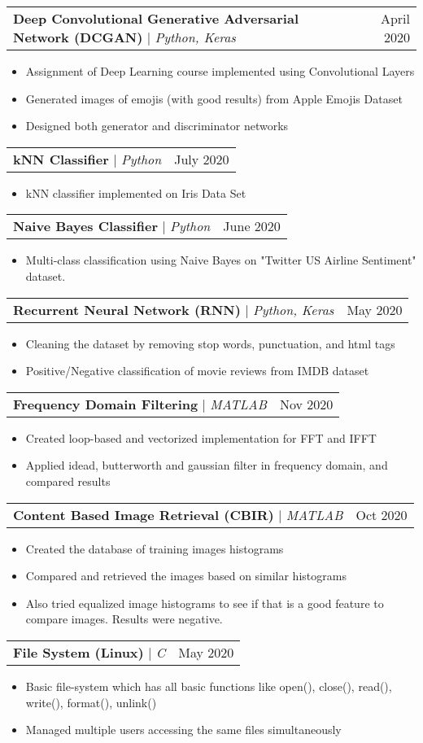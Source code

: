 \documentclass[letterpaper,11pt]{article}
\makeatletter
\newcommand{\resumeItem}[1]{
  \item\small{
    {#1 \vspace{-2pt}}
  }
}
\newcommand{\resumeProjectHeading}[2]{
    \item
    \begin{tabular*}{0.97\textwidth}{l@{\extracolsep{\fill}}r}
      \small#1 & #2 \\
    \end{tabular*}\vspace{-7pt}
}
\newcommand{\resumeItemListStart}{\begin{itemize}}
\newcommand{\resumeItemListEnd}{\end{itemize}\vspace{-5pt}}
\makeatother
\begin{document}
      \resumeProjectHeading
          {\textbf{Deep Convolutional Generative Adversarial Network (DCGAN)} $|$ \emph{Python, Keras}}{April 2020}
          \resumeItemListStart
            \resumeItem{Assignment of Deep Learning course implemented using Convolutional Layers}
            \resumeItem{Generated images of emojis (with good results) from Apple Emojis Dataset}
            \resumeItem{Designed both generator and discriminator networks}
          \resumeItemListEnd
          
      \resumeProjectHeading
          {\textbf{kNN Classifier} $|$ \emph{Python}}{July 2020}
          \resumeItemListStart
            \resumeItem{kNN classifier implemented on Iris Data Set}
          \resumeItemListEnd
          
      \resumeProjectHeading
          {\textbf{Naive Bayes Classifier} $|$ \emph{Python}}{June 2020}
          \resumeItemListStart
            \resumeItem{Multi-class classification using Naive Bayes on "Twitter US Airline Sentiment" dataset.}
          \resumeItemListEnd          
          
      \resumeProjectHeading
          {\textbf{Recurrent Neural Network (RNN)} $|$ \emph{Python, Keras}}{May 2020}
          \resumeItemListStart
            \resumeItem{Cleaning the dataset by removing stop words, punctuation, and html tags}
            \resumeItem{Positive/Negative classification of movie reviews from IMDB dataset}
          \resumeItemListEnd

      \resumeProjectHeading
          {\textbf{Frequency Domain Filtering} $|$ \emph{MATLAB}}{Nov 2020}
          \resumeItemListStart
            \resumeItem{Created loop-based and vectorized implementation for FFT and IFFT}
            \resumeItem {Applied idead, butterworth and gaussian filter in frequency domain, and compared results}
          \resumeItemListEnd
         
      \resumeProjectHeading
          {\textbf{Content Based Image Retrieval (CBIR)} $|$ \emph{MATLAB}}{Oct 2020}
          \resumeItemListStart
            \resumeItem{Created the database of training images histograms}
            \resumeItem {Compared and retrieved the images based on similar histograms}
            \resumeItem{Also tried equalized image histograms to see if that is a good feature to compare images. Results were negative.}
          \resumeItemListEnd
         
      \resumeProjectHeading
          {\textbf{File System (Linux)} $|$ \emph{C}}{May 2020}
          \resumeItemListStart
            \resumeItem{Basic file-system which has all basic functions like open(), close(), read(), write(), format(), unlink()}
            \resumeItem {Managed multiple users accessing the same files simultaneously }
          \resumeItemListEnd
          
\end{document}

